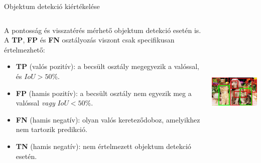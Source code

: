 \documentclass[english, aspectratio=169]{beamer}
\begin{document}
\begin{frame}{Objektum detekció kiértékelése}
\begin{columns}
\begin{column}{.65\textwidth}
A pontosság és visszatérés mérhető objektum detekció esetén is. A \textbf{TP}, \textbf{FP} és \textbf{FN} osztályozás viszont csak specifikusan értelmezhető:
\begin{itemize}
	\item \textbf{TP} (valós pozitív): a becsült osztály megegyezik a valóssal, és $IoU>50\%$.
	\item \textbf{FP} (hamis pozitív): a becsült osztály nem egyezik meg a valóssal \emph{vagy} $IoU<50\%$.
	\item \textbf{FN} (hamis negatív): olyan valós kereteződoboz, amelyikhez nem tartozik predikció.
	\item \textbf{TN} (hamis negatív): nem értelmezett objektum detekció esetén.
\end{itemize}
\end{column}
\begin{column}{.35\textwidth}
\begin{center}
\includegraphics[height=7cm, width=5cm, keepaspectratio]{images/od_8.png}
\end{center}
\end{column}
\end{columns}
\end{frame}
\end{document}
